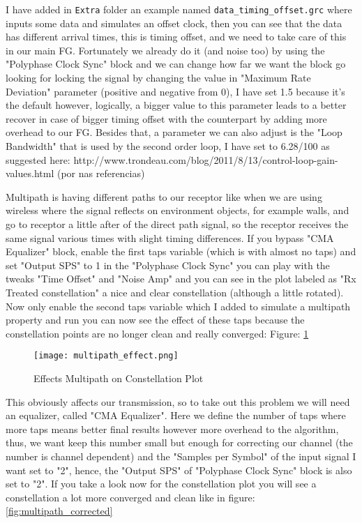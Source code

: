 \documentclass[a4paper, 10pt, conference]{ieeeconf}      %
\begin{document}
    I have added in \verb|Extra| folder an example named \verb|data_timing_offset.grc| where inputs some data and simulates an offset clock, then you can see that the data has different arrival times, this is timing offset, and we need to take care of this in our main FG. Fortunately we already do it (and noise too) by using the "Polyphase Clock Sync" block and we can change how far we want the block go looking for locking the signal by changing the value in "Maximum Rate Deviation" parameter (positive and negative from 0), I have set 1.5 because it's the default however, logically, a bigger value to this parameter leads to a better recover in case of bigger timing offset with the counterpart by adding more overhead to our FG. Besides that, a parameter we can also adjust is the "Loop Bandwidth" that is used by the second order loop, I have set to 6.28/100 as suggested here: http://www.trondeau.com/blog/2011/8/13/control-loop-gain-values.html (por nas referencias)
    
    
    Multipath is having different paths to our receptor like when we are using wireless where the signal reflects on environment objects, for example walls, and go to receptor a little after of the direct path signal, so the receptor receives the same signal various times with slight timing differences. 
    If you bypass "CMA Equalizer" block, enable the first taps variable (which is with almost no taps) and set "Output SPS" to 1 in the "Polyphase Clock Sync" you can play with the tweaks "Time Offset" and "Noise Amp" and you can see in the plot labeled as "Rx Treated constellation" a nice and clear constellation (although a little rotated). Now only enable the second taps variable which I added to simulate a multipath property and run you can now see the effect of these taps because the constellation points are no longer clean and really converged: Figure:  \ref{fig:multipath_effect}
    
    \begin{figure}
        \centering
        \texttt{[image: multipath\_effect.png]}
        \caption{Effects Multipath on Constellation Plot}
        \label{fig:multipath_effect}
    \end{figure}

    This obviously affects our transmission, so to take out this problem we will need an equalizer, called "CMA Equalizer". Here we define the number of taps where more taps means better final results however more overhead to the algorithm, thus, we want keep this number small but enough for correcting our channel (the number is channel dependent) and the "Samples per Symbol" of the input signal I want set to "2", hence, the "Output SPS" of "Polyphase Clock Sync" block is also set to "2". If you take a look now for the constellation plot you will see a constellation a lot more converged and clean like in figure: \ref{fig:multipath_corrected}
\end{document}
